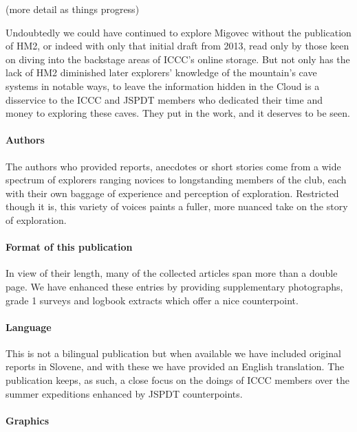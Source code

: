 \begin{tcolorbox}
\begin{fullwidth}
\begin{multicols}{2}
            (more detail as things progress)

            Undoubtedly we could have continued to explore Migovec without the publication of HM2, or indeed with only that initial draft from 2013, read only by those keen on diving into the backstage areas of ICCC's online storage. But not only has the lack of HM2 diminished later explorers' knowledge of the mountain's cave systems in notable ways, to leave the information hidden in the Cloud is a disservice to the ICCC and JSPDT members who dedicated their time and money to exploring these caves. They put in the work, and it deserves to be seen.


            \paragraph{Authors}

 			The authors who provided reports, anecdotes or short stories come from a wide spectrum of explorers ranging novices to longstanding members of the club, each with their own baggage of experience and perception of exploration. Restricted though it is, this variety of voices paints a fuller, more nuanced take on the story of exploration.


 			\paragraph{Format of this publication}

 			In view of their length, many of the collected articles span more than a double page. We have enhanced these entries by providing supplementary photographs, grade 1 surveys and logbook extracts which offer a nice counterpoint.


 			\paragraph{Language}

 			This is not a bilingual publication but when available we have included original reports in Slovene, and with these we have provided an English translation. The publication keeps, as such, a close focus on the doings of ICCC members over the summer expeditions enhanced by JSPDT counterpoints. 


 			\paragraph{Graphics}


\end{multicols}
\end{fullwidth}
\end{tcolorbox}
